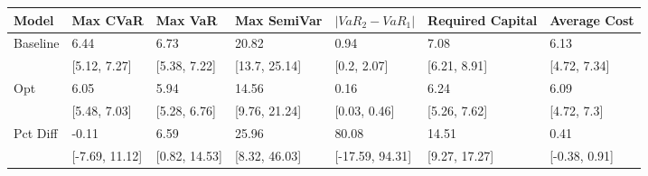 \begin{tabular}{lllllll}
\toprule
   Model &       Max CVaR &       Max VaR &   Max SemiVar & $|VaR_2 - VaR_1|$ & Required Capital &  Average Cost \\
\midrule
Baseline &           6.44 &          6.73 &         20.82 &              0.94 &             7.08 &          6.13 \\
         &   [5.12, 7.27] &  [5.38, 7.22] & [13.7, 25.14] &       [0.2, 2.07] &     [6.21, 8.91] &  [4.72, 7.34] \\
     Opt &           6.05 &          5.94 &         14.56 &              0.16 &             6.24 &          6.09 \\
         &   [5.48, 7.03] &  [5.28, 6.76] & [9.76, 21.24] &      [0.03, 0.46] &     [5.26, 7.62] &   [4.72, 7.3] \\
Pct Diff &          -0.11 &          6.59 &         25.96 &             80.08 &            14.51 &          0.41 \\
         & [-7.69, 11.12] & [0.82, 14.53] & [8.32, 46.03] &   [-17.59, 94.31] &    [9.27, 17.27] & [-0.38, 0.91] \\
\bottomrule
\end{tabular}
